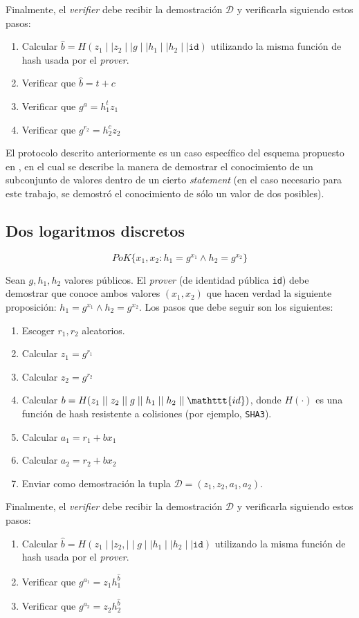 Finalmente, el \emph{verifier} debe recibir la demostración $\mathcal{D}$ y 
verificarla siguiendo estos pasos:
\begin{enumerate}
	\item Calcular $\hat{b} = H(z_1 \mid\mid z_2 \mid\mid g \mid\mid h_1 \mid\mid h_2 \mid\mid \mathtt{id})$ utilizando la misma función de hash usada por el \emph{prover}.
	\item Verificar que $\hat{b} = t + c$
	\item Verificar que $g^a = h_1^t z_1$
	\item Verificar que $g^{r_2} = h_2^c z_2$
\end{enumerate} 

El protocolo descrito anteriormente es un caso específico del esquema propuesto en \cite{cramer1994proofs}, en el cual se describe la manera de demostrar el conocimiento de un subconjunto de valores dentro de un cierto \emph{statement} (en el caso necesario para este trabajo, se demostró el conocimiento de sólo un valor de dos posibles). 

\subsection{Dos logaritmos discretos}

$$PoK\{x_1, x_2 : h_1 = g^{x_1} \land h_2 = g^{x_2}\}$$

Sean $g,h_1,h_2$ valores públicos. El \emph{prover} (de identidad pública 
\texttt{id}) debe demostrar que conoce ambos valores $(x_1,x_2)$ que hacen 
verdad la siguiente proposición: $h_1 = g^{x_1} \land h_2 = g^{x_2}$. Los 
pasos que debe seguir son los siguientes:
\begin{enumerate}
	\item Escoger $r_1, r_2$ aleatorios.
	\item Calcular $z_1 = g^{r_1} $
	\item Calcular $z_2 = g^{r_2}$
	\item Calcular $b = H(z_1 \mid\mid z_2 \mid\mid g \mid\mid h_1 \mid\mid h_2 \mid\mid \mathttt{id})$, donde $H(\cdot)$ es una función de hash resistente a colisiones (por ejemplo, \texttt{SHA3}).
	\item Calcular $a_1 = r_1 + b x_1$
	\item Calcular $a_2 = r_2 + b x_2$
	\item Enviar como demostración la tupla $\mathcal{D} = (z_1, z_2, a_1, a_2)$.
\end{enumerate}

Finalmente, el \emph{verifier} debe recibir la demostración $\mathcal{D}$ y verificarla siguiendo estos pasos:
\begin{enumerate}
	\item Calcular $\hat{b} = H(z_1 \mid\mid z_2, \mid\mid g \mid\mid h_1 \mid\mid h_2 \mid\mid \mathtt{id})$ utilizando la misma función de hash usada por el \emph{prover}.
	\item Verificar que $g^{a_1} = z_1 h_1^\hat{b}$
	\item Verificar que $g^{a_2} = z_2 h_2^\hat{b}$
\end{enumerate}

